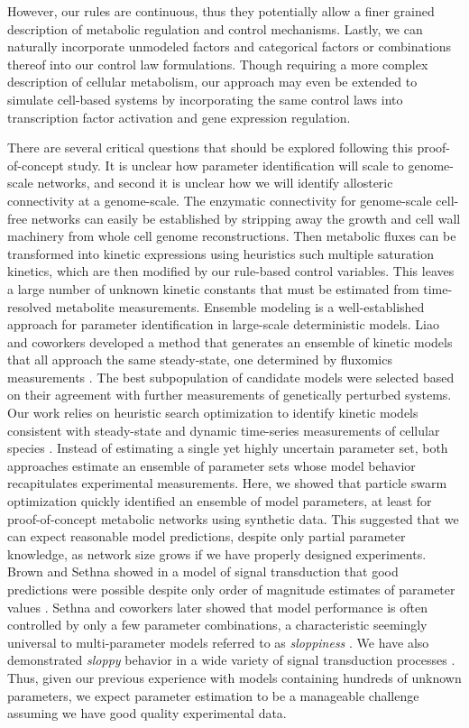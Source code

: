 \documentclass[processes,article,accept,moreauthors,pdftex,12pt,a4paper]{mdpi}
\begin{document}
However, our rules are continuous, thus they potentially allow a finer grained description of metabolic regulation and control mechanisms.
Lastly, we can naturally incorporate unmodeled factors and categorical factors or combinations thereof into our control law formulations. 
Though requiring a more complex description of cellular metabolism, our approach may even be extended to simulate cell-based systems by incorporating the same control laws into transcription factor activation and gene expression regulation. 

There are several critical questions that should be explored following this proof-of-concept study.
It is unclear how parameter identification will scale to genome-scale networks, and second it is unclear how we will identify allosteric connectivity at a genome-scale. 
The enzymatic connectivity for genome-scale cell-free networks can easily be established by stripping away the growth and cell wall machinery from whole cell genome reconstructions.
Then metabolic fluxes can be transformed into kinetic expressions using heuristics such multiple saturation kinetics, which are then modified by our rule-based control variables.  
This leaves a large number of unknown kinetic constants that must be estimated from time-resolved metabolite measurements. 
Ensemble modeling is a well-established approach for parameter identification in large-scale deterministic models. 
Liao and coworkers developed a method that generates an ensemble of kinetic models that all approach the same steady-state, one determined by fluxomics measurements \cite{Tran:2008aa}. 
The best subpopulation of candidate models were selected based on their agreement with further measurements of genetically perturbed systems. 
Our work relies on heuristic search optimization to identify kinetic models consistent with steady-state and dynamic time-series measurements of cellular species \citep{Luan:2007aa,Song:2009aa,Tasseff:2010aa,Tasseff:2011aa,Nayak:2011aa,Lequieu:2011aa}. 
Instead of estimating a single yet highly uncertain parameter set, both approaches estimate an ensemble of parameter sets whose model behavior recapitulates experimental measurements. 
Here, we showed that particle swarm optimization quickly identified an ensemble of model parameters, at least for proof-of-concept metabolic networks using synthetic data. 
This suggested that we can expect reasonable model predictions, despite only partial parameter knowledge, as network size grows if we have properly designed experiments. 
Brown and Sethna showed in a model of signal transduction that good predictions were possible despite only order of magnitude estimates of parameter values \citep{Brown:2003aa}.
Sethna and coworkers later showed that model performance is often controlled by only a few parameter combinations, 
a characteristic seemingly universal to multi-parameter models referred to as \textit{sloppiness} \citep{Machta:2013aa}.
We have also demonstrated \textit{sloppy} behavior in a wide variety of signal transduction processes \citep{Luan:2007aa,Song:2009aa,Tasseff:2010aa,Tasseff:2011aa,Nayak:2011aa,Lequieu:2011aa}.
Thus, given our previous experience with models containing hundreds of unknown parameters, we expect parameter estimation to be a manageable challenge assuming 
we have good quality experimental data. 
\end{document}
